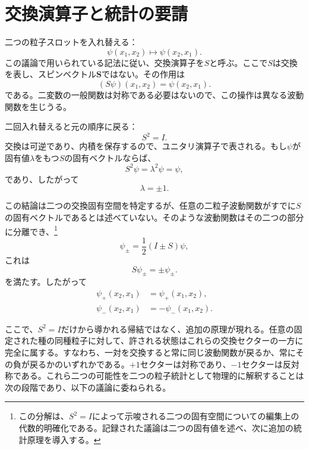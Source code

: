 \section{交換演算子と統計の要請}

二つの粒子スロットを入れ替える：
\begin{equation}
\psi(x_{1},x_{2})\longmapsto\psi(x_{2},x_{1}).
\end{equation}
この議論で用いられている記法に従い、交換演算子を\(S\)と呼ぶ。ここで\(S\)は交換を表し、スピンベクトル\(\mathbf S\)ではない。その作用は
\begin{equation}
(S\psi)(x_{1},x_{2})=\psi(x_{2},x_{1}).
\end{equation}
である。二変数の一般関数は対称である必要はないので、この操作は異なる波動関数を生じうる。

二回入れ替えると元の順序に戻る：
\begin{equation}
S^{2}=I.
\end{equation}
交換は可逆であり、内積を保存するので、ユニタリ演算子で表される。もし\(\psi\)が固有値\(\lambda\)をもつ\(S\)の固有ベクトルならば、
\[
S^{2}\psi=\lambda^{2}\psi=\psi,
\]
であり、したがって
\begin{equation}
\lambda=\pm1.
\end{equation}

この結論は二つの交換固有空間を特定するが、任意の二粒子波動関数がすでに\(S\)の固有ベクトルであるとは述べていない。そのような波動関数はその二つの部分に分離でき、\footnote{この分解は、\(S^{2}=I\)によって示唆される二つの固有空間についての編集上の代数的明確化である。記録された議論は二つの固有値を述べ、次に追加の統計原理を導入する。}
\begin{equation}
\psi_{\pm}=\frac12(I\pm S)\psi,
\end{equation}
これは
\begin{equation}
S\psi_{\pm}=\pm\psi_{\pm}.
\end{equation}
を満たす。したがって
\begin{align}
\psi_{+}(x_{2},x_{1})&=\psi_{+}(x_{1},x_{2}),\\
\psi_{-}(x_{2},x_{1})&=-\psi_{-}(x_{1},x_{2}).
\end{align}

ここで、\(S^{2}=I\)だけから導かれる帰結ではなく、追加の原理が現れる。任意の固定された種の同種粒子に対して、許される状態はこれらの交換セクターの一方に完全に属する。すなわち、一対を交換すると常に同じ波動関数が戻るか、常にその負が戻るかのいずれかである。\(+1\)セクターは対称であり、\(-1\)セクターは反対称である。これら二つの可能性を二つの粒子統計として物理的に解釈することは次の段階であり、以下の議論に委ねられる。
